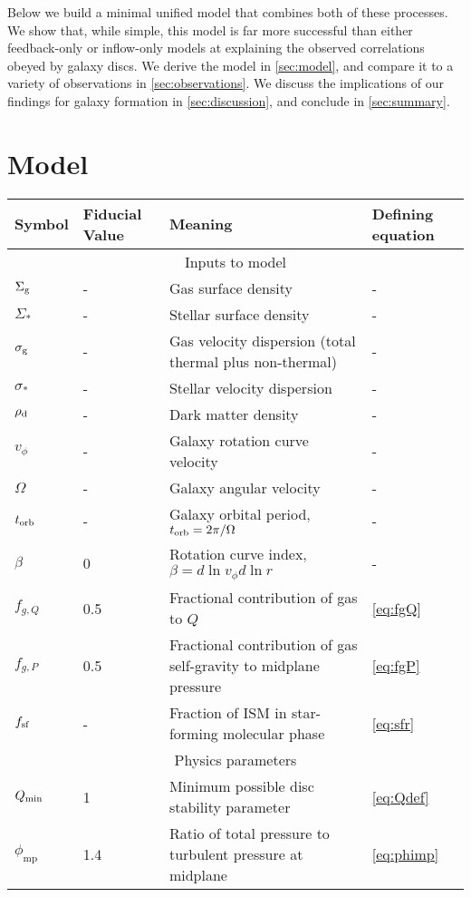 \documentclass[useAMS,usenatbib]{mn2e}
\newcommand{\phimp}{\phi_{\mathrm{mp}}}
\begin{document}
Below we build a minimal unified model that combines both of these processes. We show that, while simple, this model is far more successful than either feedback-only or inflow-only models at explaining the observed correlations obeyed by galaxy discs. We derive the model in \autoref{sec:model}, and compare it to a variety of observations in \autoref{sec:observations}. We discuss the implications of our findings for galaxy formation in \autoref{sec:discussion}, and conclude in \autoref{sec:summary}.


\section{Model}
\label{sec:model}

\begin{table*}
\begin{tabular}{llll}
\hline
Symbol & Fiducial Value & Meaning & Defining equation \\
\hline
\multicolumn{4}{c}{Inputs to model} \\
\hline
$\Sigma_{\rm g}$ & - & Gas surface density & - \\
$\Sigma_*$ & - & Stellar surface density & - \\
$\sigma_{\rm g}$ & - & Gas velocity dispersion (total thermal plus non-thermal) & - \\
$\sigma_*$ & - & Stellar velocity dispersion & - \\
$\rho_{\rm d}$ & - & Dark matter density & - \\
$v_\phi$ & - & Galaxy rotation curve velocity & - \\
$\Omega$ & - & Galaxy angular velocity & - \\
$t_{\rm orb}$ & - & Galaxy orbital period, $t_{\rm orb} = 2\pi/\Omega$ & - \\
$\beta$ & 0 & Rotation curve index, $\beta = d\ln v_\phi d\ln r$ & - \\
$f_{g,Q}$ & 0.5 & Fractional contribution of gas to $Q$ & \ref{eq:fgQ} \\
$f_{g,P}$ & 0.5 & Fractional contribution of gas self-gravity to midplane pressure & \ref{eq:fgP} \\
$f_{\rm sf}$ & - & Fraction of ISM in star-forming molecular phase & \ref{eq:sfr} \\
\hline
\multicolumn{4}{c}{Physics parameters} \\
\hline
$Q_{\rm min}$ & 1 & Minimum possible disc stability parameter & \ref{eq:Qdef} \\
$\phimp$ & 1.4 & Ratio of total pressure to turbulent pressure at midplane & \ref{eq:phimp} \\

\end{tabular}
\end{table*}
\end{document}
